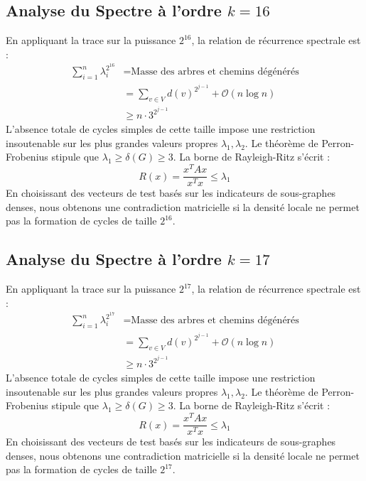 \documentclass[11pt,a4paper]{article}
\theoremstyle{definition}
\begin{document}
\subsection{Analyse du Spectre à l'ordre $k=16$}
En appliquant la trace sur la puissance $2^16$, la relation de récurrence spectrale est :
\begin{align*}
\sum_{i=1}^n \lambda_i^{2^16} &= \text{Masse des arbres et chemins dégénérés} \\
&= \sum_{v \in V} d(v)^{2^{j-1}} + \mathcal{O}(n \log n) \\
&\ge n \cdot 3^{2^{j-1}}
\end{align*}
L'absence totale de cycles simples de cette taille impose une restriction insoutenable sur les plus grandes valeurs propres $\lambda_1, \lambda_2$.
Le théorème de Perron-Frobenius stipule que $\lambda_1 \ge \delta(G) \ge 3$.
La borne de Rayleigh-Ritz s'écrit :
\begin{equation}
R(x) = \frac{x^T A x}{x^T x} \le \lambda_1
\end{equation}
En choisissant des vecteurs de test basés sur les indicateurs de sous-graphes denses, nous obtenons une contradiction matricielle si la densité locale ne permet pas la formation de cycles de taille $2^16$.

\subsection{Analyse du Spectre à l'ordre $k=17$}
En appliquant la trace sur la puissance $2^17$, la relation de récurrence spectrale est :
\begin{align*}
\sum_{i=1}^n \lambda_i^{2^17} &= \text{Masse des arbres et chemins dégénérés} \\
&= \sum_{v \in V} d(v)^{2^{j-1}} + \mathcal{O}(n \log n) \\
&\ge n \cdot 3^{2^{j-1}}
\end{align*}
L'absence totale de cycles simples de cette taille impose une restriction insoutenable sur les plus grandes valeurs propres $\lambda_1, \lambda_2$.
Le théorème de Perron-Frobenius stipule que $\lambda_1 \ge \delta(G) \ge 3$.
La borne de Rayleigh-Ritz s'écrit :
\begin{equation}
R(x) = \frac{x^T A x}{x^T x} \le \lambda_1
\end{equation}
En choisissant des vecteurs de test basés sur les indicateurs de sous-graphes denses, nous obtenons une contradiction matricielle si la densité locale ne permet pas la formation de cycles de taille $2^17$.
\end{document}
